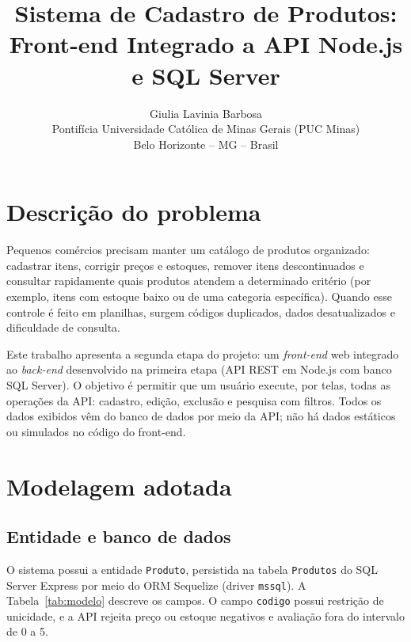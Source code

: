 \documentclass[12pt]{article}
\title{Sistema de Cadastro de Produtos: Front-end Integrado a API Node.js e SQL Server}
\author{Giulia Lavinia Barbosa\\
Pontifícia Universidade Católica de Minas Gerais (PUC Minas)\\
Belo Horizonte -- MG -- Brasil}
\date{}
\begin{document}
\maketitle

\section{Descrição do problema}

Pequenos comércios precisam manter um catálogo de produtos organizado: cadastrar itens, corrigir preços e estoques, remover itens descontinuados e consultar rapidamente quais produtos atendem a determinado critério (por exemplo, itens com estoque baixo ou de uma categoria específica). Quando esse controle é feito em planilhas, surgem códigos duplicados, dados desatualizados e dificuldade de consulta.

Este trabalho apresenta a segunda etapa do projeto: um \textit{front-end} web integrado ao \textit{back-end} desenvolvido na primeira etapa (API REST em Node.js com banco SQL Server). O objetivo é permitir que um usuário execute, por telas, todas as operações da API: cadastro, edição, exclusão e pesquisa com filtros. Todos os dados exibidos vêm do banco de dados por meio da API; não há dados estáticos ou simulados no código do front-end.

\section{Modelagem adotada}

\subsection{Entidade e banco de dados}

O sistema possui a entidade \texttt{Produto}, persistida na tabela \texttt{Produtos} do SQL Server Express por meio do ORM Sequelize (driver \texttt{mssql}). A Tabela~\ref{tab:modelo} descreve os campos. O campo \texttt{codigo} possui restrição de unicidade, e a API rejeita preço ou estoque negativos e avaliação fora do intervalo de 0 a 5.
\end{document}
